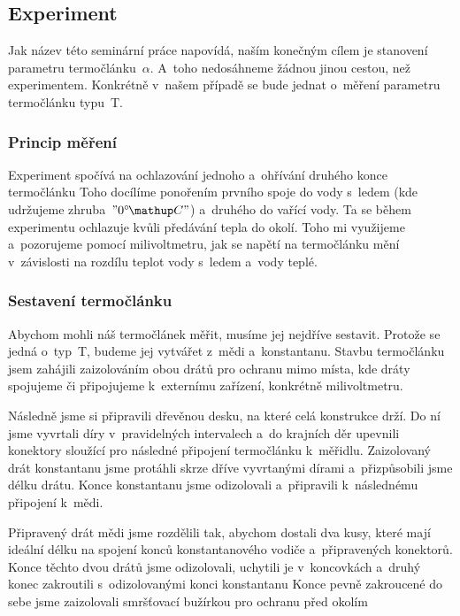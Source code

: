 \subsection{Experiment}
Jak název této seminární práce napovídá, naším konečným cílem je stanovení
parametru termočlánku~$\alpha$. A~toho nedosáhneme žádnou jinou cestou, než
experimentem. Konkrétně v~našem případě se bude jednat o~měření parametru
termočlánku typu~T.

\subsubsection{Princip měření}
Experiment spočívá na ochlazování jednoho a~ohřívání druhého konce termočlánku%
 Toho docílíme ponořením prvního
spoje do vody s~ledem (kde udržujeme zhruba~$"0 \C"$) a~druhého do vařící vody.
Ta se během experimentu ochlazuje kvůli předávání tepla do okolí. Toho mi
využijeme a~pozorujeme pomocí milivoltmetru, jak se napětí na termočlánku
mění v~závislosti na rozdílu teplot vody s~ledem a~vody teplé.

\subsubsection{Sestavení termočlánku}
Abychom mohli náš termočlánek měřit, musíme jej nejdříve sestavit. Protože se
jedná o~typ~T, budeme jej vytvářet z~mědi a~konstantanu. Stavbu termočlánku
jsem zahájili zaizolováním obou drátů pro ochranu mimo místa, kde dráty spojujeme
či připojujeme k~externímu zařízení, konkrétně milivoltmetru.

Následně jsme si připravili dřevěnou desku, na které celá konstrukce drží.
Do ní jsme vyvrtali díry v~pravidelných intervalech a~do krajních děr upevnili
konektory sloužící pro následné připojení termočlánku k~měřidlu. Zaizolovaný
drát konstantanu jsme protáhli skrze dříve vyvrtanými dírami a~přizpůsobili
jsme délku drátu. Konce konstantanu jsme odizolovali a~připravili k~následnému
připojení k~mědi.

Připravený drát mědi jsme rozdělili tak, abychom dostali dva kusy, které mají
ideální délku na spojení konců konstantanového vodiče a~připravených konektorů.
Konce těchto dvou drátů jsme odizolovali, uchytili je v~koncovkách a~druhý
konec zakroutili s~odizolovanými konci konstantanu%
Konce pevně zakroucené do sebe jsme zaizolovali smršťovací bužírkou pro ochranu
před okolím

